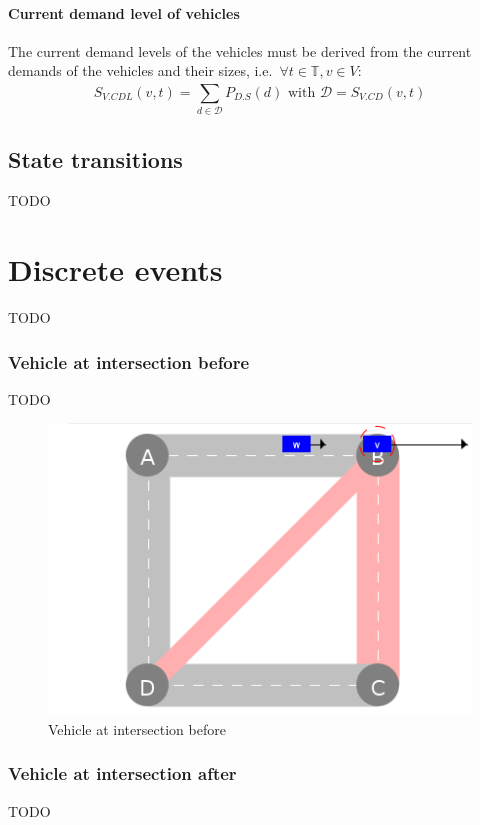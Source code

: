 \documentclass[graybox]{svmult}
\begin{document}
\paragraph{Current demand level of vehicles}
The current demand levels of the vehicles must be derived from the current demands of the vehicles and their sizes, i.e.\ $\forall t \in \mathbb{T}, v \in V:$
\[
S_{V.CDL}(v,t)=\sum_{d \in \mathcal{D}}^{}P_{D.S}(d) \textrm{ with } \mathcal{D}=S_{V.CD}(v,t)
\]

\subsection{State transitions}
\label{sec:transitions}
TODO

\section{Discrete events}
\label{sec:events}
TODO

\subsubsection{Vehicle at intersection before}
TODO

\begin{figure}[htbp]
	\centering
	\includegraphics[scale=0.5]{../../events/vehicle-at-intersection-before.png}
	\caption{Vehicle at intersection before}
	\label{fig:vehicle-at-intersection-before}
\end{figure}

\subsubsection{Vehicle at intersection after}
TODO
\end{document}
